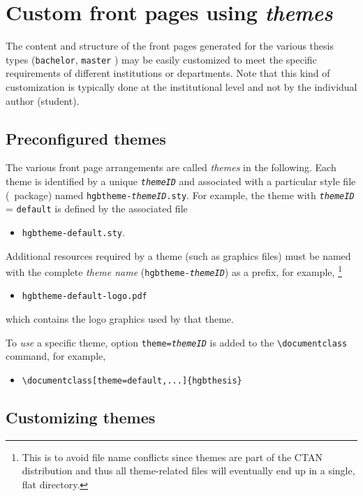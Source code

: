 \documentclass[language=english]{hgbarticle}
\begin{document}
\section{Custom front pages using \emph{themes}}
\label{sec:Themes}

The content and structure of the front pages generated for the various thesis types
(\texttt{bachelor}, \texttt{master} \etc) may be easily customized to meet the specific
requirements of different institutions or departments.
Note that this kind of customization is typically done at the institutional level and not
by the individual author (student).


\subsection{Preconfigured themes}

The various front page arrangements are called \emph{themes} in the following.
Each theme is identified by a unique \texttt{\textit{themeID}} and associated with a 
particular style file (\latex\ package) named 
\texttt{hgbtheme-\textit{themeID}.sty}.
For example, the theme with \texttt{\textit{themeID}} = \texttt{default} is defined 
by the associated file
\begin{itemize}
  \item[] \texttt{hgbtheme-default.sty}.
\end{itemize}
%
Additional resources required by a theme (such as graphics files) must be named with the 
complete \emph{theme name} (\texttt{hgbtheme-\textit{themeID}})
as a prefix, for example,%
\footnote{This is to avoid file name conflicts since themes are part of the 
CTAN distribution and thus all theme-related files will eventually end up in a single, 
flat directory.}
\begin{itemize}
	\item[] \texttt{hgbtheme-default-logo.pdf}
\end{itemize}
%
which contains the logo graphics used by that theme.

To \emph{use} a specific theme, option \texttt{theme=\textit{themeID}}
is added to the \verb!\documentclass! command, for example,
\begin{itemize}
	\item[] \verb!\documentclass[theme=default,...]{hgbthesis}!
\end{itemize}


\subsection{Customizing themes}
\label{sec:CustomizingThemes}
\end{document}
